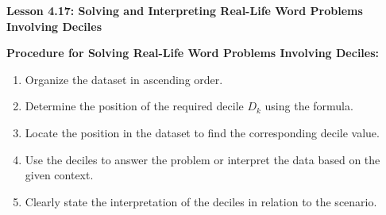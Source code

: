 \begin{center}
\textbf{Lesson 4.17: Solving and Interpreting Real-Life Word Problems Involving Deciles}
\end{center}

\vspace*{-1.5ex}

\noindent\textbf{Procedure for Solving Real-Life Word Problems Involving Deciles:}  
\begin{enumerate}
    \item Organize the dataset in ascending order.  
    \item Determine the position of the required decile \(D_k\) using the formula.  
    \item Locate the position in the dataset to find the corresponding decile value.  
    \item Use the deciles to answer the problem or interpret the data based on the given context.  
    \item Clearly state the interpretation of the deciles in relation to the scenario.
\end{enumerate}
